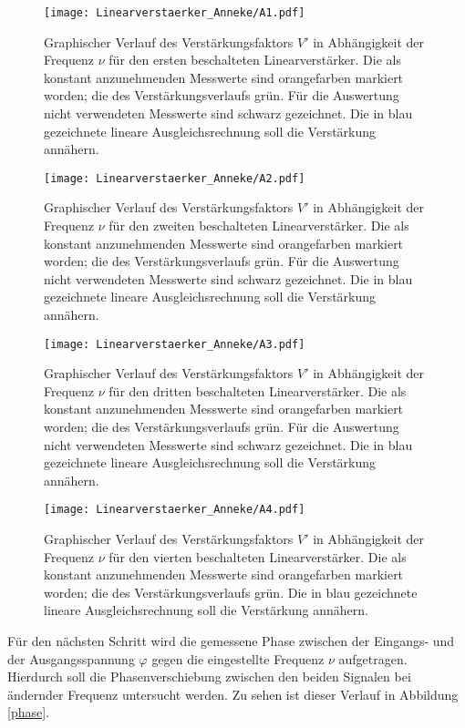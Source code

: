 \begin{figure}[h]
  \centering
  \texttt{[image: Linearverstaerker\_Anneke/A1.pdf]}
  \caption{Graphischer Verlauf des Verstärkungsfaktors $V'$ in Abhängigkeit der Frequenz $\nu$ für den ersten beschalteten Linearverstärker. Die als konstant anzunehmenden Messwerte sind orangefarben markiert worden; die des Verstärkungsverlaufs grün. Für die Auswertung nicht verwendeten Messwerte sind schwarz gezeichnet. Die in blau gezeichnete lineare Ausgleichsrechnung soll die Verstärkung annähern.}
  \label{linear1}
\end{figure}
\begin{figure}[h]
  \centering
  \texttt{[image: Linearverstaerker\_Anneke/A2.pdf]}
  \caption{Graphischer Verlauf des Verstärkungsfaktors $V'$ in Abhängigkeit der Frequenz $\nu$ für den zweiten beschalteten Linearverstärker. Die als konstant anzunehmenden Messwerte sind orangefarben markiert worden; die des Verstärkungsverlaufs grün. Für die Auswertung nicht verwendeten Messwerte sind schwarz gezeichnet.  Die in blau gezeichnete lineare Ausgleichsrechnung soll die Verstärkung annähern.}
  \label{linear2}
\end{figure}
\begin{figure}[h]
  \centering
  \texttt{[image: Linearverstaerker\_Anneke/A3.pdf]}
  \caption{Graphischer Verlauf des Verstärkungsfaktors $V'$ in Abhängigkeit der Frequenz $\nu$ für den dritten beschalteten Linearverstärker. Die als konstant anzunehmenden Messwerte sind orangefarben markiert worden; die des Verstärkungsverlaufs grün. Für die Auswertung nicht verwendeten Messwerte sind schwarz gezeichnet.  Die in blau gezeichnete lineare Ausgleichsrechnung soll die Verstärkung annähern.}
  \label{linear3}
\end{figure}
\begin{figure}[h]
  \centering
  \texttt{[image: Linearverstaerker\_Anneke/A4.pdf]}
  \caption{Graphischer Verlauf des Verstärkungsfaktors $V'$ in Abhängigkeit der Frequenz $\nu$ für den vierten beschalteten Linearverstärker. Die als konstant anzunehmenden Messwerte sind orangefarben markiert worden; die des Verstärkungsverlaufs grün.  Die in blau gezeichnete lineare Ausgleichsrechnung soll die Verstärkung annähern.}
  \label{linear4}
\end{figure}
\clearpage
Für den nächsten Schritt wird die gemessene Phase zwischen der Eingangs- und der Ausgangsspannung $\varphi$ gegen die eingestellte Frequenz $\nu$ aufgetragen. Hierdurch soll die Phasenverschiebung zwischen den beiden Signalen bei ändernder Frequenz untersucht werden. Zu sehen ist dieser Verlauf in Abbildung \ref{phase}.
